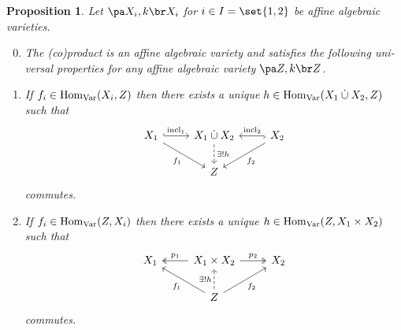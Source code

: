 \documentclass[12pt,a4paper]{scrartcl}
\theoremstyle{cplain}
\theoremstyle{cplain}
\theoremstyle{cplain}
\newtheorem{prop}[thmcounter]{Proposition}
\theoremstyle{definition}
\begin{document}
\begin{otherlanguage}{english}
\begin{prop}
  Let $\aav {X_i}$ for $i\in I=\set{1,2}$ be affine algebraic varieties.
  \begin{enumerate}
    \setcounter{enumi}{-1}
    \item \label{prop:VIII.1:0} The (co)product is an affine algebraic variety and satisfies the following universal properties for any affine algebraic variety $\aav Z$.
    \item \label{prop:VIII.1:1} If $f_i \in \operatorname{Hom}_{\operatorname{Var}}(X_i,Z)$ then there exists a unique $h\in \operatorname{Hom}_{\operatorname{Var}}(X_1\mathbin{\dot{\cup}} X_2, Z)$ such that
    \[\begin{tikzcd}
        X_1 \arrow[hookrightarrow]{r}{\incl_1} \arrow{dr}[swap]{f_1} & X_1 \dotcup X_2 \arrow[dashed]{d}{\exists!h} & X_2 \arrow[hookrightarrow]{l}[swap]{\incl_2} \arrow{dl}{f_2}  \\
        & Z
    \end{tikzcd}\]
  commutes.
  \item \label{prop:VIII.1:2} If $f_i \in \operatorname{Hom}_{\operatorname{Var}}(Z,X_i)$ then there exists a unique $h\in \operatorname{Hom}_{\operatorname{Var}}( Z,X_1\times X_2)$ such that
    \[\begin{tikzcd}
        X_1   & \arrow[twoheadrightarrow]{l}[swap]{p_1} X_1 \times X_2  \arrow[twoheadrightarrow]{r}{p_2}& X_2   \\
        & Z \arrow{ul}{f_1}\arrow{ur}[swap]{f_2} \arrow[dashed]{u}{\exists!h}
    \end{tikzcd}\]
    commutes.
  \end{enumerate}
\end{prop}

\end{otherlanguage}
\end{document}
